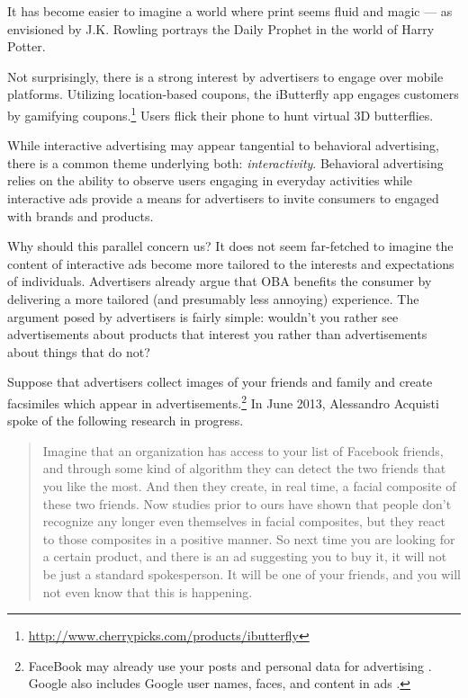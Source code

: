 It has become easier to imagine a world where print seems fluid and magic --- as envisioned by J.K. Rowling portrays the Daily Prophet in the world of Harry Potter.

Not surprisingly, there is a strong interest by advertisers to engage over mobile platforms. Utilizing location-based coupons, the iButterfly app engages customers by gamifying  coupons.\footnote{\url{http://www.cherrypicks.com/products/ibutterfly}}  Users flick their phone to hunt virtual 3D butterflies.

While interactive advertising may appear tangential to behavioral advertising, there is a common theme underlying both: \emph{interactivity}. Behavioral advertising relies on the ability to observe users engaging in everyday activities while interactive ads provide a means for advertisers to invite consumers to engaged with brands and products.

Why should this parallel concern us? It does not seem far-fetched to imagine the content of interactive ads become more tailored to the interests and expectations of individuals. Advertisers already argue that OBA benefits the consumer by delivering a more tailored (and presumably less annoying) experience. The argument posed by advertisers is fairly simple: wouldn't you rather see advertisements about products that interest you rather than advertisements about things that do not?

Suppose that advertisers collect images of your friends and family and create facsimiles which appear in  advertisements.\footnote{FaceBook may already use your posts and personal data for advertising \citep{goel:2013nyt}. Google also includes Google user names, faces, and content in ads \citep{kelly:2013cnn}.}  In June 2013, Alessandro Acquisti spoke of the following research in progress.

\begin{quote}
Imagine that an organization has access to your list of Facebook friends, and through some kind of algorithm they can detect the two friends that you like the most. And then they create, in real time, a facial composite of these two friends. Now studies prior to ours have shown that people don't recognize any longer even themselves in facial composites, but they react to those composites in a positive manner. So next time you are looking for a certain product, and there is an ad suggesting you to buy it, it will not be just a standard spokesperson. It will be one of your friends, and you will not even know that this is happening. \citep{acquisti:2013ted}
\end{quote}

